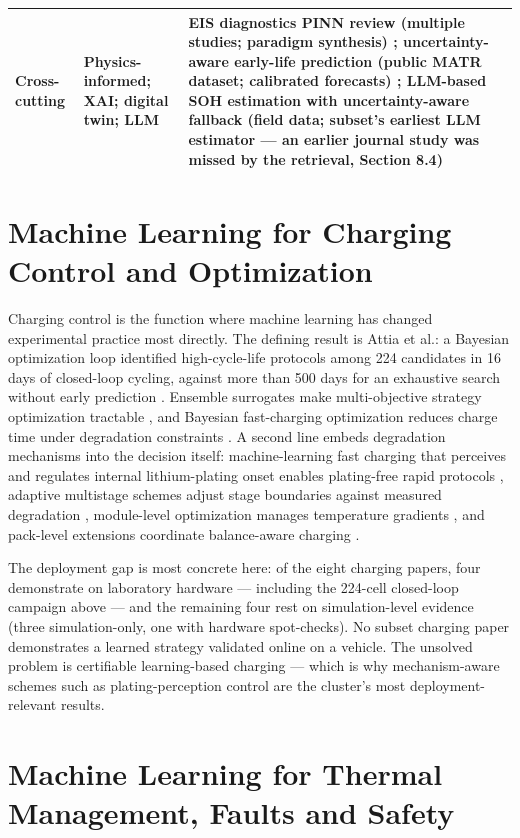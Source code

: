\documentclass[journal]{IEEEtran}
\begin{document}
\begin{table}[!t]
\begin{tabular}{|p{1.01in}|p{2.11in}|p{3.52in}|}
Cross-cutting & Physics-informed; XAI; digital twin; LLM & EIS diagnostics PINN review (multiple studies; paradigm synthesis) \cite{r21}; uncertainty-aware early-life prediction (public MATR dataset; calibrated forecasts) \cite{r77}; LLM-based SOH estimation with uncertainty-aware fallback (field data; subset's earliest LLM estimator --- an earlier journal study was missed by the retrieval, Section 8.4) \cite{r15} \\
\hline
\end{tabular}
\end{table}

\section{Machine Learning for Charging Control and Optimization}

Charging control is the function where machine learning has changed experimental practice most directly. The defining result is Attia et al.: a Bayesian optimization loop identified high-cycle-life protocols among 224 candidates in 16 days of closed-loop cycling, against more than 500 days for an exhaustive search without early prediction \cite{r4}. Ensemble surrogates make multi-objective strategy optimization tractable \cite{r71}, and Bayesian fast-charging optimization reduces charge time under degradation constraints \cite{r78}. A second line embeds degradation mechanisms into the decision itself: machine-learning fast charging that perceives and regulates internal lithium-plating onset enables plating-free rapid protocols \cite{r70}, adaptive multistage schemes adjust stage boundaries against measured degradation \cite{r79}, module-level optimization manages temperature gradients \cite{r80}, and pack-level extensions coordinate balance-aware charging \cite{r81}\cite{r82}.

The deployment gap is most concrete here: of the eight charging papers, four demonstrate on laboratory hardware --- including the 224-cell closed-loop campaign above --- and the remaining four rest on simulation-level evidence (three simulation-only, one with hardware spot-checks). No subset charging paper demonstrates a learned strategy validated online on a vehicle. The unsolved problem is certifiable learning-based charging --- which is why mechanism-aware schemes such as plating-perception control \cite{r70} are the cluster's most deployment-relevant results.

\section{Machine Learning for Thermal Management, Faults and Safety}
\end{document}
